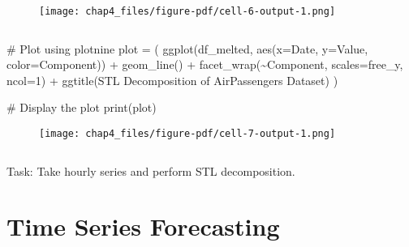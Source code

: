 \documentclass[
  letterpaper,
  DIV=11,
  numbers=noendperiod]{scrreprt}
\newenvironment{Shaded}{\begin{snugshade}}{\end{snugshade}}
\newcommand{\BuiltInTok}[1]{\textcolor[rgb]{0.00,0.23,0.31}{#1}}
\newcommand{\CommentTok}[1]{\textcolor[rgb]{0.37,0.37,0.37}{#1}}
\newcommand{\DecValTok}[1]{\textcolor[rgb]{0.68,0.00,0.00}{#1}}
\newcommand{\NormalTok}[1]{\textcolor[rgb]{0.00,0.23,0.31}{#1}}
\newcommand{\OperatorTok}[1]{\textcolor[rgb]{0.37,0.37,0.37}{#1}}
\newcommand{\StringTok}[1]{\textcolor[rgb]{0.13,0.47,0.30}{#1}}
\begin{document}
\begin{figure}[H]

{\centering \texttt{[image: chap4\_files/figure-pdf/cell-6-output-1.png]}

}

\end{figure}

\begin{verbatim}
\end{verbatim}

\begin{Shaded}
\begin{Highlighting}[]
\CommentTok{\# Plot using plotnine}
\NormalTok{plot }\OperatorTok{=}\NormalTok{ (}
\NormalTok{    ggplot(df\_melted, aes(x}\OperatorTok{=}\StringTok{\textquotesingle{}Date\textquotesingle{}}\NormalTok{, y}\OperatorTok{=}\StringTok{\textquotesingle{}Value\textquotesingle{}}\NormalTok{, color}\OperatorTok{=}\StringTok{\textquotesingle{}Component\textquotesingle{}}\NormalTok{)) }\OperatorTok{+}
\NormalTok{    geom\_line() }\OperatorTok{+}
\NormalTok{    facet\_wrap(}\StringTok{\textquotesingle{}\textasciitilde{}Component\textquotesingle{}}\NormalTok{, scales}\OperatorTok{=}\StringTok{\textquotesingle{}free\_y\textquotesingle{}}\NormalTok{, ncol}\OperatorTok{=}\DecValTok{1}\NormalTok{) }\OperatorTok{+}
\NormalTok{    ggtitle(}\StringTok{\textquotesingle{}STL Decomposition of AirPassengers Dataset\textquotesingle{}}\NormalTok{)}
\NormalTok{)}

\CommentTok{\# Display the plot}
\BuiltInTok{print}\NormalTok{(plot)}
\end{Highlighting}
\end{Shaded}

\begin{figure}[H]

{\centering \texttt{[image: chap4\_files/figure-pdf/cell-7-output-1.png]}

}

\end{figure}

\begin{verbatim}
\end{verbatim}

Task: Take hourly series and perform STL decomposition.


\hypertarget{time-series-forecasting}{%
\chapter{Time Series Forecasting}\label{time-series-forecasting}}
\end{document}
